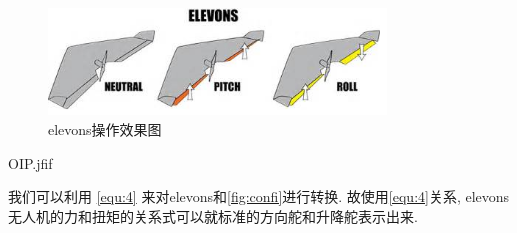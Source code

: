 \documentclass[UTF8,a4paper,10pt,nocolorlinks]{ctexart}
\begin{document}
\begin{itemize}
      \begin{figure}
        \centering
        \includegraphics[width=0.8\textwidth]{picture/OIP.png}
        \caption{elevons操作效果图}
      \end{figure}

      OIP.jfif

      我们可以利用 \ref{equ:4} 来对elevons和\ref{fig:confi}进行转换. 
      故使用\ref{equ:4}关系, elevons无人机的力和扭矩的关系式可以就标准的方向舵和升降舵表示出来.
    \end{itemize}
\end{document}
